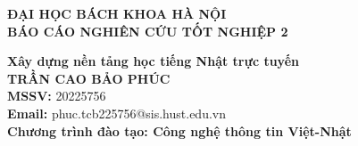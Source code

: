 \documentclass[DoAn.tex]{subfiles}
\begin{document}
\begin{titlepage}
\thispagestyle{empty}
\begin{center}

{\textbf{\large{ĐẠI HỌC BÁCH KHOA HÀ NỘI}}}\\[1.5cm]

{\textbf{\huge{ BÁO CÁO NGHIÊN CỨU TỐT NGHIỆP 2}}}\\[0.8cm]
{\textbf{\Large{Xây dựng nền tảng học tiếng Nhật trực tuyến}}\\[1.2cm]

{\textbf{\large{TRẦN CAO BẢO PHÚC}}}\\
{\large{\textbf{MSSV:} 20225756}}\\[0.4cm]
{\large{\textbf{Email:} phuc.tcb225756@sis.hust.edu.vn}}\\[0.4cm]

{\textbf{\large{Chương trình đào tạo: Công nghệ thông tin Việt-Nhật}}}\\

\vspace{0.8cm}
\begin{table}[H]
\centering
{}
\end{table}}
\end{center}

\end{titlepage}
\end{document}
